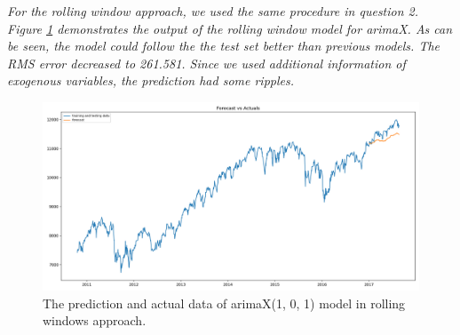 \textit{For the rolling window approach, we used the same procedure in question 2. Figure \ref{fig:Ass2_Q3_Rolling_Forecast_vs_Actuals} demonstrates the output of the rolling window model for \gls{arima}X. As can be seen, the model could follow the the test set better than previous models. The RMS error decreased to 261.581. Since we used additional information of exogenous variables, the prediction had some ripples.}

\begin{figure}[H]
    \centering
    \begin{minipage}[b]{1\textwidth}
        \includegraphics[width=\textwidth]{manuscript/src/figures/Ass2/Ass2_Q3_Rolling_Forecast_vs_Actuals.png}
    \end{minipage}
    \caption{The prediction and actual data of \gls{arima}X(1, 0, 1) model in rolling windows approach.}
    \label{fig:Ass2_Q3_Rolling_Forecast_vs_Actuals}
\end{figure}








